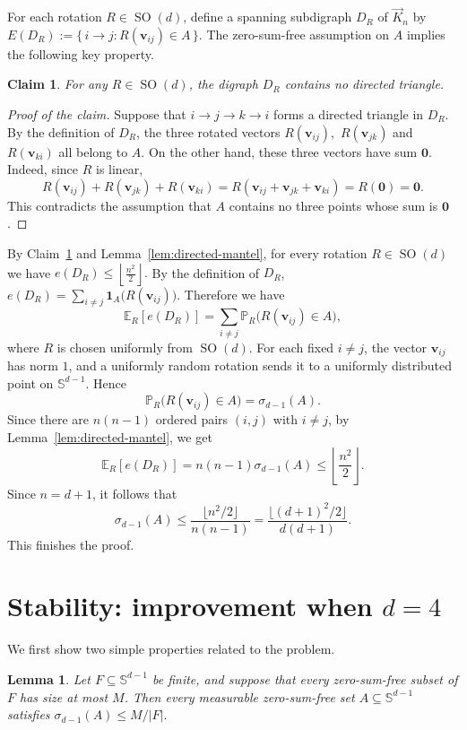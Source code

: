 \documentclass[11pt]{article}
\newtheorem{lemma}[theorem]{Lemma}
\newtheorem{claim}[theorem]{Claim}
\newcommand{\SO}{\operatorname{SO}}
\theoremstyle{definition}
\newenvironment{poc}{\begin{proof}[Proof of the claim]\renewcommand*{\qedsymbol}{$\blacksquare$}}{\end{proof}}
\begin{document}
For each rotation \(R\in \SO(d)\), define a spanning subdigraph
\(D_R\) of \(\vec K_n\) by
\(
    E(D_R):=\{\, i\to j : R(\boldsymbol v_{ij})\in A \,\}.
\)
The zero-sum-free assumption on \(A\) implies the following key property.
\begin{claim}\label{claim:trianglefree}
For any \(R\in \SO(d)\), the digraph \(D_{R}\) contains no directed triangle.
\end{claim}

\begin{poc}
Suppose that \(i\to j\to k\to i\) forms a directed
triangle in \(D_{R}\). By the definition of \(D_{R}\), the three rotated
vectors
\(
    R(\boldsymbol{v}_{ij}),\) \(
    R(\boldsymbol{v}_{jk})\) and
    \(R(\boldsymbol{v}_{ki})
\)
all belong to \(A\). On the other hand, these three vectors have sum
\(\boldsymbol{0}\). Indeed, since \(R\) is linear,
\[
    R(\boldsymbol{v}_{ij})+R(\boldsymbol{v}_{jk})+R(\boldsymbol{v}_{ki})
    =
    R(\boldsymbol{v}_{ij}+\boldsymbol{v}_{jk}+\boldsymbol{v}_{ki})
    =
    R(\boldsymbol{0})
    =
    \boldsymbol{0}.
\]
This contradicts the assumption that \(A\) contains no three points whose
sum is \(\boldsymbol{0}\).
\end{poc}

  By Claim~\ref{claim:trianglefree} and Lemma~\ref{lem:directed-mantel}, for every rotation \(R\in\SO(d)\) we have
\(
    e(D_{R})\le \left\lfloor \frac{n^{2}}{2}\right\rfloor .
\)
By the definition of \(D_{R}\),
\(
    e(D_{R})
    =
    \sum_{i\ne j} \boldsymbol{1}_{A}\bigl(R(\boldsymbol{v}_{ij})\bigr).
\)
Therefore we have
\[
    \mathbb E_{R} \left[ e(D_{R})\right]
    =
    \sum_{i\ne j}\mathbb P_{R}\bigl(R(\boldsymbol{v}_{ij})\in A\bigr),
\]
where \(R\) is chosen uniformly from \(\SO(d)\). For each fixed \(i\ne j\),
the vector \(\boldsymbol{v}_{ij}\) has norm \(1\), and a uniformly random
rotation sends it to a uniformly distributed point on \(\mathbb S^{d-1}\).
Hence
\[
    \mathbb P_{R}\bigl(R(\boldsymbol{v}_{ij})\in A\bigr)
    =
    \sigma_{d-1}(A).
\]
Since there are \(n(n-1)\) ordered pairs \((i,j)\) with \(i\ne j\), by Lemma~\ref{lem:directed-mantel}, we get
\[
    \mathbb E_{R} \left[e(D_{R})\right]=n(n-1)\sigma_{d-1}(A)\le
    \left\lfloor \frac{n^{2}}{2}\right\rfloor .
\]
Since \(n=d+1\), it follows that
\[
    \sigma_{d-1}(A)
    \le
    \frac{\lfloor n^{2}/2\rfloor}{n(n-1)}
    =
    \frac{\lfloor (d+1)^{2}/2\rfloor}{d(d+1)}.
\]
This finishes the proof.


\section{Stability: improvement when \texorpdfstring{\(d=4\)}{d=4}}
\label{subsec:d4-stability}
We first show two simple properties related to the problem.
\begin{lemma}\label{lem:finite-averaging}
Let \(F\subseteq\mathbb S^{d-1}\) be finite, and suppose that every
zero-sum-free subset of \(F\) has size at most \(M\).  Then every
measurable zero-sum-free set \(A\subseteq\mathbb S^{d-1}\) satisfies
\(
    \sigma_{d-1}(A)\le M/|F|.
\)
\end{lemma}
\end{document}
